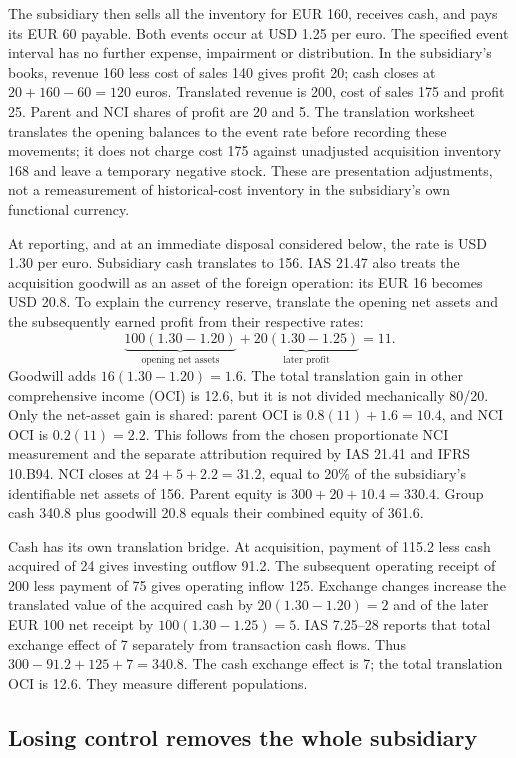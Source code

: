 The subsidiary then sells all the inventory for EUR 160, receives cash, and
pays its EUR 60 payable. Both events occur at USD 1.25 per euro. The specified
event interval has no further expense, impairment or distribution. In the
subsidiary's books, revenue 160 less cost of sales 140 gives profit 20; cash
closes at \(20+160-60=120\) euros. Translated revenue is 200, cost of sales
175 and profit 25. Parent and NCI shares of profit are 20 and 5. The
translation worksheet translates the opening balances to the event rate
before recording these movements; it does not charge cost 175 against
unadjusted acquisition inventory 168 and leave a temporary negative stock.
These are presentation adjustments, not a remeasurement of historical-cost
inventory in the subsidiary's own functional currency.

At reporting, and at an immediate disposal considered below, the rate is
USD 1.30 per euro. Subsidiary cash translates to 156. IAS 21.47 also treats
the acquisition goodwill as an asset of the foreign operation: its EUR 16
becomes USD 20.8. To explain the currency reserve, translate the opening net
assets and the subsequently earned profit from their respective rates:
\[
  \underbrace{100(1.30-1.20)}_{\text{opening net assets}}
  +\underbrace{20(1.30-1.25)}_{\text{later profit}}=11.
\]
Goodwill adds \(16(1.30-1.20)=1.6\). The total translation gain in other
comprehensive income (OCI) is 12.6, but it is not divided mechanically 80/20.
Only the net-asset gain is shared: parent OCI is \(0.8(11)+1.6=10.4\),
and NCI OCI is \(0.2(11)=2.2\). This follows from the chosen proportionate
NCI measurement and the separate attribution required by IAS 21.41 and
IFRS 10.B94. NCI closes at \(24+5+2.2=31.2\), equal to 20\% of the
subsidiary's identifiable net assets of 156. Parent equity is
\(300+20+10.4=330.4\). Group cash 340.8 plus goodwill 20.8 equals their
combined equity of 361.6.

Cash has its own translation bridge. At acquisition, payment of 115.2 less
cash acquired of 24 gives investing outflow 91.2. The subsequent operating
receipt of 200 less payment of 75 gives operating inflow 125. Exchange
changes increase the translated value of the acquired cash by
\(20(1.30-1.20)=2\) and of the later EUR 100 net receipt by
\(100(1.30-1.25)=5\). IAS 7.25--28 reports that total exchange effect of
7 separately from transaction cash flows. Thus
\(300-91.2+125+7=340.8\). The cash exchange effect is 7; the total
translation OCI is 12.6. They measure different populations.

\subsection{Losing control removes the whole subsidiary}
\label{sec:foreign-disposal-reserves}

